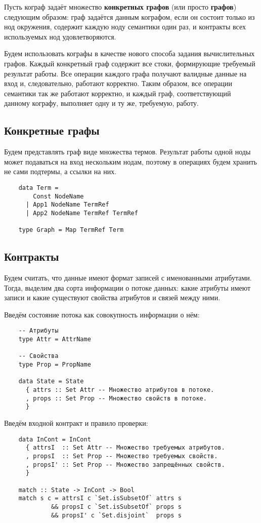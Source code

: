 Пусть кограф задаёт множество \textbf{конкретных графов} (или просто \textbf{графов}) следующим образом:
граф задаётся данным кографом, если он состоит только из нод окружения, содержит каждую ноду семантики один раз, и контракты всех используемых нод удовлетворяются.

Будем использовать кографы в качестве нового способа задания вычислительных графов.
Каждый конкретный граф содержит все стоки, формирующие требуемый результат работы.
Все операции каждого графа получают валидные данные на вход и, следовательно, работают корректно.
Таким образом, все операции семантики так же работают корректно, и каждый граф, соответствующий данному кографу, выполняет одну и ту же, требуемую, работу.


\subsection{Конкретные графы}

Будем представлять граф виде множества термов. Результат работы одной ноды может подаваться на вход нескольким нодам, поэтому в операциях будем хранить не сами подтермы, а ссылки на них.

\begin{lstlisting}
    data Term =
        Const NodeName
      | App1 NodeName TermRef
      | App2 NodeName TermRef TermRef

    type Graph = Map TermRef Term
\end{lstlisting}


\subsection{Контракты}

Будем считать, что данные имеют формат записей с именованными атрибутами.
Тогда, выделим два сорта информации о потоке данных: какие атрибуты имеют записи и какие существуют свойства атрибутов и связей между ними.

Введём состояние потока как совокупность информации о нём:
\begin{lstlisting}
    -- Атрибуты
    type Attr = AttrName

    -- Свойства
    type Prop = PropName

    data State = State
      { attrs :: Set Attr -- Множество атрибутов в потоке.
      , props :: Set Prop -- Множество свойств в потоке.
      }
\end{lstlisting}

Введём входной контракт и правило проверки:
\begin{lstlisting}
    data InCont = InCont
      { attrsI  :: Set Attr -- Множество требуемых атрибутов.
      , propsI  :: Set Prop -- Множество требуемых свойств.
      , propsI' :: Set Prop -- Множество запрещённых свойств.
      }

    match :: State -> InCont -> Bool
    match s c = attrsI c `Set.isSubsetOf` attrs s
             && propsI c `Set.isSubsetOf` props s
             && propsI' c `Set.disjoint`  props s
\end{lstlisting}

